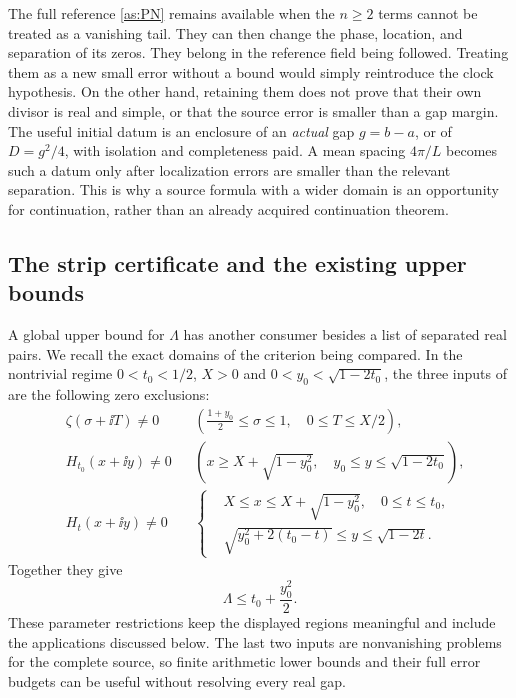 The full reference \eqref{as:PN} remains available when the $n\ge2$
terms cannot be treated as a vanishing tail.  They can then change the
phase, location, and separation of its zeros.  They belong in the
reference field being followed.  Treating them as a new small error
without a bound would simply reintroduce the clock hypothesis.  On the
other hand, retaining them does not prove that their own divisor is
real and simple, or that the source error is smaller than a gap margin.
The useful initial datum is an enclosure of an \emph{actual} gap
$g=b-a$, or of $D=g^2/4$, with isolation and completeness paid.  A mean
spacing $4\pi/L$ becomes such a datum only after localization errors
are smaller than the relevant separation.  This is why a source formula
with a wider domain is an opportunity for continuation, rather than an
already acquired continuation theorem.

\subsection{The strip certificate and the existing upper bounds}

A global upper bound for $\Lambda$ has another consumer besides a list
of separated real pairs.  We recall the exact domains of the criterion
being compared.  In the nontrivial regime $0<t_0<1/2$, $X>0$ and
$0<y_0<\sqrt{1-2t_0}$, the three inputs of
\cite[Theorem 1.2]{Polymath2019} are the following zero exclusions:
\begin{align}
 &\zeta(\sigma+\ii T)\ne0
 &&\left(\frac{1+y_0}{2}\le\sigma\le1,
                       \quad0\le T\le X/2\right),
                       \label{as:strip-initial}\\
 &H_{t_0}(x+\ii y)\ne0
 &&\left(x\ge X+\sqrt{1-y_0^2},
                   \quad y_0\le y\le\sqrt{1-2t_0}\right),
                       \label{as:strip-final}\\
 &H_t(x+\ii y)\ne0
 &&\left\{\begin{aligned}
       &X\le x\le X+\sqrt{1-y_0^2},\quad0\le t\le t_0,\\
       &\sqrt{y_0^2+2(t_0-t)}\le y\le\sqrt{1-2t}.
       \end{aligned}\right.
                       \label{as:strip-barrier}
\end{align}
Together they give
\begin{equation}
 \Lambda\le t_0+\frac{y_0^2}{2}.
 \label{as:strip-output}
\end{equation}
These parameter restrictions keep the displayed regions meaningful
and include the applications discussed below. The last two inputs
are nonvanishing problems for the complete source, so finite arithmetic
lower bounds and their full error budgets can be useful without resolving
every real gap.

